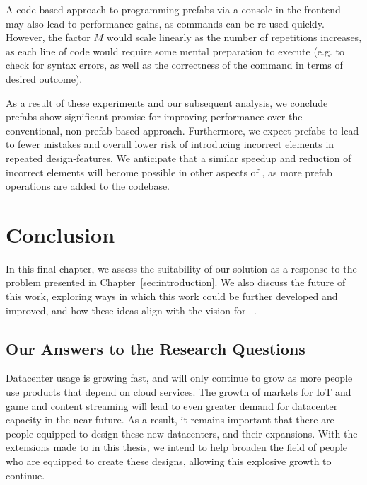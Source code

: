 \documentclass[11pt]{article}
\begin{document}
			A code-based approach to programming prefabs via a console in the frontend may also lead to performance gains, as commands can be re-used quickly.
			However, the factor $M$ would scale linearly as the number of repetitions increases, as each line of code would require some mental preparation to execute (e.g. to check for syntax errors, as well as the correctness of the command in terms of desired outcome).

			As a result of these experiments and our subsequent analysis, we conclude prefabs show significant promise for improving performance over the conventional, non-prefab-based approach. 
			Furthermore, we expect prefabs to lead to fewer mistakes and overall lower risk of introducing incorrect elements in repeated design-features. 
			We anticipate that a similar speedup and reduction of incorrect elements will become possible in other aspects of \opendc{}, as more prefab operations are added to the \opendc{} codebase.

\newpage

\section{Conclusion} \label{sec:conclusion}
	In this final chapter, we assess the suitability of our solution as a response to the problem presented in Chapter~\ref{sec:introduction}.
	We also discuss the future of this work, exploring ways in which this work could be further developed and improved, and how these ideas align with the vision for \opendc{}~\cite{Iosup2017}.

	\subsection{Our Answers to the Research Questions}
		Datacenter usage is growing fast, and will only continue to grow as more people use products that depend on cloud services.
		The growth of markets for IoT and game and content streaming will lead to even greater demand for datacenter capacity in the near future.
		As a result, it remains important that there are people equipped to design these new datacenters, and their expansions.
		With the extensions made to \opendc{} in this thesis, we intend to help broaden the field of people who are equipped to create these designs, allowing this explosive growth to continue.
\end{document}
